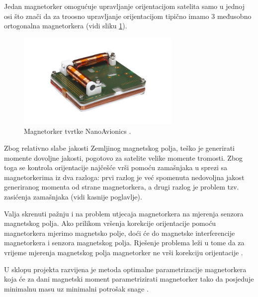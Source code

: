 \documentclass[times, utf8, diplomski, numeric]{templates/template}
\begin{document}
{{{{                Jedan magnetorker omogućuje upravljanje orijentacijom satelita samo u jednoj osi što znači da za troosno upravljanje orijentacijom tipično imamo 3 međusobno ortogonalna magnetorkera (vidi sliku \ref{fig:magnetorquer_img}).

                \begin{figure}[htb]
                \centering
                \includegraphics[width=0.7\textwidth]{images/magnetorquer_img.jpg}
                \caption{Magnetorker tvrtke NanoAvionics \cite{magnetorquer_cite}.}
                \label{fig:magnetorquer_img}
                \end{figure}

                Zbog relativno slabe jakosti Zemljinog magnetskog polja, teško je generirati momente dovoljne jakosti, pogotovo za satelite velike momente tromosti. Zbog toga se kontrola orijentacije najčešće vrši pomoću zamašnjaka u sprezi sa magnetorkerima iz dva razloga: prvi razlog je već spomenuta nedovoljna jakost generiranog momenta od strane magnetorkera, a drugi razlog je problem tzv. zasićenja zamašnjaka (vidi kasnije poglavlje).

                Valja skrenuti pažnju i na problem utjecaja magnetorkera na mjerenja senzora magnetskog polja. Ako prilikom vršenja korekcije orijentacije pomoću magnetorkera mjerimo magnetsko polje, doći će do magnetske interferencije magnetorkera i senzora magnetskog polja. Rješenje problema leži u tome da za vrijeme mjerenja magnetskog polja magnetorker ne vrši korekciju orijentacije \cite{adcsKnjiga}.

                U sklopu projekta razvijena je metoda optimalne parametrizacije magnetorkera koja će za dani magnetski moment parametrizirati magnetorker tako da posjeduje minimalnu masu uz minimalni potrošak snage \cite{magnetorker_ieee}.
            }

}}}
\end{document}

